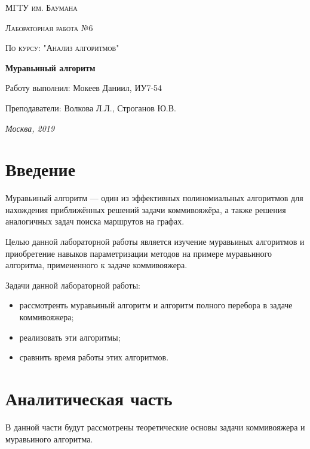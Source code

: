 \documentclass[12pt]{report}
\begin{document}
\begin{titlepage}
	\centering
	{\scshape\LARGE МГТУ им. Баумана \par}
	\vspace{3cm}
	{\scshape\Large Лабораторная работа №6\par}
	\vspace{0.5cm}	
	{\scshape\Large По курсу: "Анализ алгоритмов"\par}
	\vspace{1.5cm}
	{\huge\bfseries Муравьиный алгоритм\par}
	\vspace{2cm}
	\Large Работу выполнил: Мокеев Даниил, ИУ7-54\par
	\vspace{0.5cm}
	\Large Преподаватели:  Волкова Л.Л., Строганов Ю.В.\par

	\vfill
	\large \textit {Москва, 2019} \par
\end{titlepage}

\tableofcontents

\newpage
\chapter*{Введение}

Муравьиный алгоритм — один из эффективных полиномиальных алгоритмов для нахождения приближённых решений задачи коммивояжёра, а также решения аналогичных задач поиска маршрутов на графах.

Целью данной лабораторной работы является изучение муравьиных алгоритмов и приобретение навыков параметризации методов на примере муравьиного алгоритма, примененного к задаче коммивояжера.

Задачи данной лабораторной работы:
\begin{itemize}
	\item рассмотренть муравьиный алгоритм и алгоритм полного перебора в задаче коммивояжера;
	\item реализовать эти алгоритмы;
	\item сравнить время работы этих алгоритмов.
\end{itemize}


\chapter{Аналитическая часть}
В данной части будут рассмотрены теоретические основы задачи коммивояжера и муравьиного алгоритма. 
\end{document}

